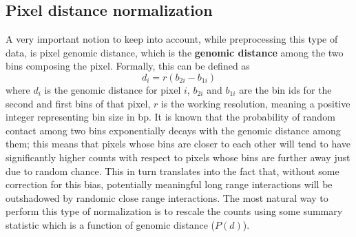 \subsection{Pixel distance normalization}\label{par:distnorm}

A very important notion to keep into account, while preprocessing this type of data, is pixel genomic distance, which is the \textbf{genomic distance} among the two bins composing the pixel. Formally, this can be defined as 
$$d_i = r(b_{2i} - b_{1i})$$
where $d_i$ is the genomic distance for pixel $i$, $b_{2i}$ and $b_{1i}$ are the bin ids for the second and first bins of that pixel, $r$ is the working resolution, meaning a positive integer representing bin size in bp. It is known that the probability of random contact among two bins exponentially decays with the genomic distance among them\cite{distancedecay2009}; this means that pixels whose bins are closer to each other will tend to have significantly higher counts with respect to pixels whose bins are further away just due to random chance. This in turn translates into the fact that, without some correction for this bias, potentially meaningful long range interactions will be outshadowed by randomic close range interactions. The most natural way to perform this type of normalization is to rescale the counts using some summary statistic which is a function of genomic distance ($P(d)$).

